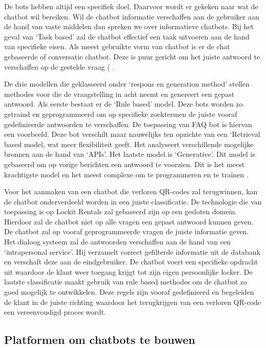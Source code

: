 De bots hebben altijd een specifiek doel. Daarvoor wordt er gekeken naar wat de chatbot wil bereiken. Wil de chatbot informatie verschaffen aan de gebruiker aan de hand van vaste middelen dan spreken we over informatieve chatbots. Bij het geval van ‘Task based’ zal de chatbot effectief een taak uitvoeren aan de hand van specifieke eisen. Als meest gebruikte vorm van chatbot is er de chat gebaseerde of conversatie chatbot. Deze is puur gericht om het juiste antwoord te verschaffen op de gestelde vraag (\autocite{Nimavat2017} \autocite{Adamopoulou2020}. 

De drie modellen die geklasseerd onder ‘respons en generation method’ stellen methodes voor die de vraagstelling in acht neemt en genereert een gepast antwoord. Als eerste bestaat er de ‘Rule based’ model. Deze bots worden zo getraind en geprogrammeerd om op specifieke zoektermen de juiste vooraf gedefinieerde antwoorden te verschaffen. De toepassing van \ac{FAQ} bot is hiervan een voorbeeld. Deze bot verschilt maar nauwelijks ten opzichte van een ‘Retrieval based model, wat meer flexibiliteit geeft. Het analyseert verschillende mogelijke bronnen aan de hand van ‘APIs’. Het laatste model is ‘Generative’.  Dit model is gebaseerd om op vorige berichten een antwoord te voorzien. Dit is het meest krachtigste model en het meest complexe om te programmeren en te trainen \autocite{Adamopoulou2020} \autocite{Hien2018}.

Voor het aanmaken van een chatbot die verloren QR-codes zal terugwinnen, kan de chatbot onderverdeeld worden in een juiste classificatie. De technologie die van toepassing is op Lockit Rentals zal gebaseerd zijn op een gesloten domein. Hierdoor zal de chatbot niet op alle vragen een gepast antwoord kunnen geven. De chatbot zal op vooraf geprogrammeerde vragen de juiste informatie geven. Het dialoog systeem zal de antwoorden verschaffen aan de hand van een ‘intrapersonal service’. Hij verzamelt correct gefilterde informatie uit de databank en verschaft deze aan de eindgebruiker. De chatbot voert een specifieke opdracht uit waardoor de klant weer toegang krijgt tot zijn eigen persoonlijke locker. De laatste classificatie maakt gebruik van rule based methodes om de chatbot zo goed mogelijk te ontwikkelen. Deze regels zijn vooraf gedefinieerd en begeleiden de klant in de juiste richting waardoor het terugkrijgen van een verloren QR-code een vereenvoudigd proces wordt.
\subsection{Platformen om chatbots te bouwen}%
\label{sec:chatbotBouwen}

